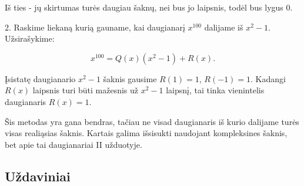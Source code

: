 Iš ties - jų skirtumas turės daugiau šaknų, nei bus jo laipsnis, todėl bus
lygus $0$.


2. Raskime liekaną kurią gauname, kai daugianarį $x^{100}$ dalijame iš $x^2
- 1$. Užsirašykime:
 
$$x^{100} = Q(x)(x^2-1) + R(x).$$

Įsistatę daugianario $x^2-1$ šaknis gausime $R(1) = 1$, $R(-1)=1$. Kadangi
$R(x)$ laipsnis turi būti mažesnis už $x^2 - 1$ laipsnį, tai tinka
vienintelis daugianaris $R(x) = 1$.  

Šis metodas yra gana bendras, tačiau ne visad daugianaris iš kurio dalijame
turės visas realiąsias šaknis. Kartais galima išsisukti naudojant
kompleksines šaknis, bet apie tai daugianariai II užduotyje. 
   
\subsection{Uždaviniai}

